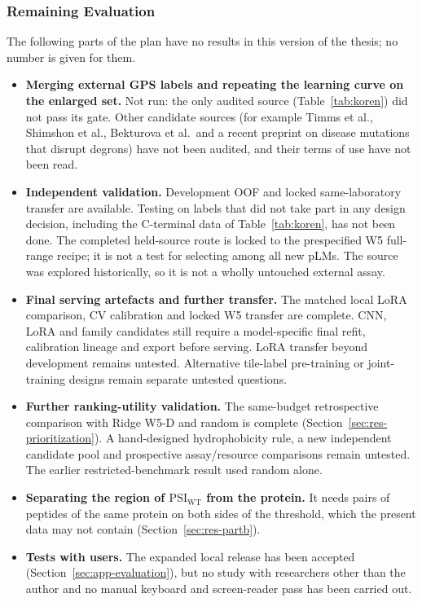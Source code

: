 





\subsubsection{Remaining Evaluation}
The following parts of the plan have no results in this version of the thesis; no number is given for them.
\begin{itemize}
  \item \textbf{Merging external GPS labels and repeating the learning curve on the enlarged set.} Not run: the only audited
        source (Table~\ref{tab:koren}) did not pass its gate. Other candidate sources (for example Timms et al., Shimshon et al., Bekturova et al.\ and a recent preprint on disease mutations
        that disrupt degrons) have not been audited, and their terms of use have not been read.
  \item \textbf{Independent validation.} Development OOF and locked same-laboratory transfer are available. Testing on labels that did not take part in any
        design decision, including the C-terminal data of Table~\ref{tab:koren}, has not been done.
        The completed held-source route is locked to the prespecified W5 full-range recipe;
        it is not a test for selecting among all new pLMs. The source was explored historically,
        so it is not a wholly untouched external assay.
  \item \textbf{Final serving artefacts and further transfer.} The matched local LoRA comparison,
        CV calibration and locked W5 transfer are complete. CNN, LoRA and family candidates still
        require a model-specific final refit, calibration lineage and export before serving. LoRA transfer
        beyond development remains untested. Alternative tile-label
        pre-training or joint-training designs remain separate untested questions.
  \item \textbf{Further ranking-utility validation.} The same-budget retrospective comparison with
        Ridge W5-D and random is complete (Section~\ref{sec:res-prioritization}). A hand-designed
        hydrophobicity rule, a new independent candidate pool and prospective assay/resource
        comparisons remain untested. The earlier restricted-benchmark result used random alone.
  \item \textbf{Separating the region of $\mathrm{PSI}_{\mathrm{WT}}$ from the protein.} It needs pairs of peptides of the same protein on both sides
        of the threshold, which the present data may not contain (Section~\ref{sec:res-partb}).
  \item \textbf{Tests with users.} The expanded local release has been accepted
        (Section~\ref{sec:app-evaluation}), but no study with researchers other than the author and
        no manual keyboard and screen-reader pass has been carried out.
\end{itemize}

